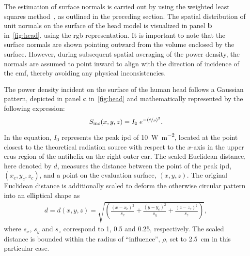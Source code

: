 The estimation of surface normals is carried out by using the weighted least squares method~\cite{Levin1998approximation}, as outlined in the preceding section.
The spatial distribution of unit normals on the surface of the head model is visualized in panel \textbf{b} in~\cref{fig:head}, using the \gls{rgb} representation.
It is important to note that the surface normals are shown pointing outward from the volume enclosed by the surface.
However, during subsequent spatial averaging of the power density, the normals are assumed to point inward to align with the direction of incidence of the \gls{emf}, thereby avoiding any physical inconsistencies.

The power density incident on the surface of the human head follows a Gaussian pattern, depicted in panel \textbf{c} in~\cref{fig:head} and mathematically represented by the following expression:
\begin{align}
    S_\text{inc}(x, y, z) = I_0 \; e^{-\left( \nicefrac{d}{\rho} \right)^2}.
\end{align}
In the equation, $I_0$ represents the peak \gls{ipd} of \SI{10}{\watt\per\m\squared}, located at the point closest to the theoretical radiation source with respect to the $x$-axis in the upper crus region of the antihelix on the right outer ear.
The scaled Euclidean distance, here denoted by $d$, measures the distance between the point of the peak \gls{ipd}, $(x_c, y_c, z_c)$, and a point on the evaluation surface, $(x, y, z)$.
The original Euclidean distance is additionally scaled to deform the otherwise circular pattern into an elliptical shape as
\begin{align}
    d = d(x, y, z) = \sqrt{\left( \frac{(x - x_c)^2}{s_x} + \frac{(y - y_c)^2}{s_y} + \frac{(z - z_c)^2}{s_z} \right)},
\end{align}
where  $s_x$, $s_y$ and $s_z$ correspond to \num{1}, \num{0.5} and \num{0.25}, respectively.
The scaled distance is bounded within the radius of ``influence'', $\rho$, set to \SI{2.5}{\cm} in this particular case.

